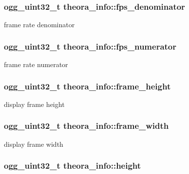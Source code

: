 \subsubsection[{fps\+\_\+denominator}]{\setlength{\rightskip}{0pt plus 5cm}ogg\+\_\+uint32\+\_\+t theora\+\_\+info\+::fps\+\_\+denominator}\label{structtheora__info_a9aa7e826e0323a4ae8cd8646a6cfbfea}


frame rate denominator 

\subsubsection[{fps\+\_\+numerator}]{\setlength{\rightskip}{0pt plus 5cm}ogg\+\_\+uint32\+\_\+t theora\+\_\+info\+::fps\+\_\+numerator}\label{structtheora__info_a3478199aa5ab213816c1819f70085ad7}


frame rate numerator 

\subsubsection[{frame\+\_\+height}]{\setlength{\rightskip}{0pt plus 5cm}ogg\+\_\+uint32\+\_\+t theora\+\_\+info\+::frame\+\_\+height}\label{structtheora__info_a287e4c194f1d2e6deb39d59f1748ea48}


display frame height 

\subsubsection[{frame\+\_\+width}]{\setlength{\rightskip}{0pt plus 5cm}ogg\+\_\+uint32\+\_\+t theora\+\_\+info\+::frame\+\_\+width}\label{structtheora__info_a8f28f4018a25634d40e4ae861fbbccfa}


display frame width 

\subsubsection[{height}]{\setlength{\rightskip}{0pt plus 5cm}ogg\+\_\+uint32\+\_\+t theora\+\_\+info\+::height}\label{structtheora__info_ae6f0274fc4a7f285c422d91abb35f9c6}


